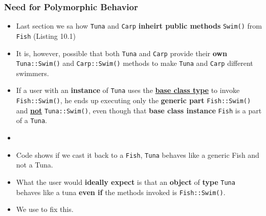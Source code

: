 \documentclass[10pt]{article}
\newcommand{\vocab}[1]{\fbox{\textbf{\textit{#1}}}}
\begin{document}
\subsubsection{Need for Polymorphic Behavior}
\begin{itemize}
	\item Last section we sa how \verb|Tuna| and \verb|Carp| \textbf{inheirt public methods} \verb|Swim()| from \verb|Fish| (Listing 10.1)

	\item It is, however, possible that both \verb|Tuna| and \verb|Carp| provide their \textbf{own} \verb|Tuna::Swim()| and \verb|Carp::Swim()| methods to make \verb|Tuna| and \verb|Carp| different swimmers.

	\item If a user with an \textbf{instance} of \verb|Tuna| uses the \underline{\textbf{base class type}} to invoke \verb|Fish::Swim()|, he ends up executing only the \textbf{generic part} \verb|Fish::Swim()| and \underline{\textbf{not}} \verb|Tuna::Swim()|, even though that \textbf{base class instance} \verb|Fish| is a part of a \verb|Tuna|.

	\item {}

	\item Code shows if we cast it back to a \verb|Fish|, \verb|Tuna| behaves like a generic Fish and not a Tuna.

	\item What the user would \textbf{ideally expect} is that an \textbf{object} of \textbf{type} \verb|Tuna| behaves like a tuna \textbf{even if} the methods invoked is \verb|Fish::Swim()|.

	\item We use \vocab{virtual functions} to fix this.
\end{itemize}

\newpage
\end{document}
